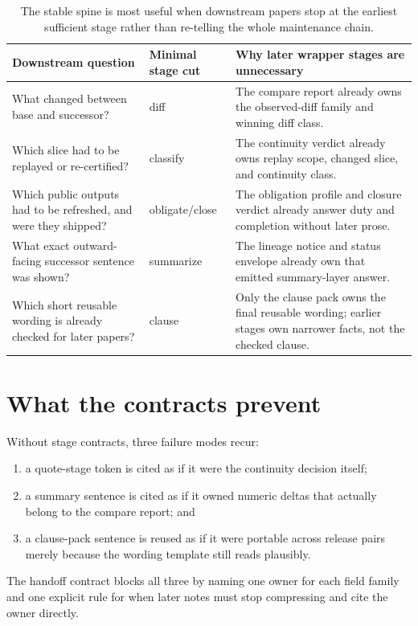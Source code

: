 \documentclass[11pt]{article}
\begin{document}
\begin{table}[t]
\centering
\small
\begin{tabularx}{\linewidth}{@{}l l X@{}}
\toprule
Downstream question & Minimal stage cut & Why later wrapper stages are unnecessary \\
\midrule
What changed between base and successor? & \textsf{diff} & The compare report already owns the observed-diff family and winning diff class. \\
Which slice had to be replayed or re-certified? & \textsf{classify} & The continuity verdict already owns replay scope, changed slice, and continuity class. \\
Which public outputs had to be refreshed, and were they shipped? & \textsf{obligate}/\textsf{close} & The obligation profile and closure verdict already answer duty and completion without later prose. \\
What exact outward-facing successor sentence was shown? & \textsf{summarize} & The lineage notice and status envelope already own that emitted summary-layer answer. \\
Which short reusable wording is already checked for later papers? & \textsf{clause} & Only the clause pack owns the final reusable wording; earlier stages own narrower facts, not the checked clause. \\
\bottomrule
\end{tabularx}
\caption{The stable spine is most useful when downstream papers stop at the earliest sufficient stage rather than re-telling the whole maintenance chain.}
\label{tab:minimal-stage-cut}
\end{table}

\section{What the contracts prevent}
Without stage contracts, three failure modes recur:
\begin{enumerate}[leftmargin=*]
\item a quote-stage token is cited as if it were the continuity decision itself;
\item a summary sentence is cited as if it owned numeric deltas that actually belong to the compare report; and
\item a clause-pack sentence is reused as if it were portable across release pairs merely because the wording template still reads plausibly.
\end{enumerate}
The handoff contract blocks all three by naming one owner for each field family and one explicit rule for when later notes must stop compressing and cite the owner directly.
\end{document}
